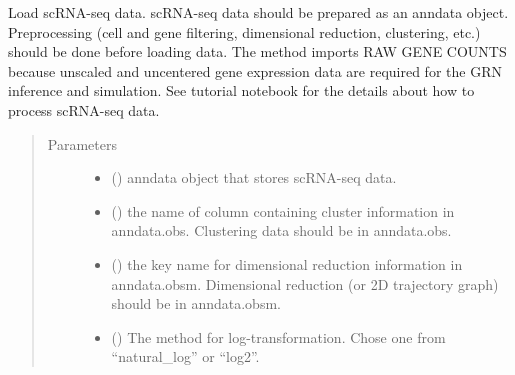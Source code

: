 \documentclass[letterpaper,10pt,english]{sphinxmanual}
\begin{document}
\begin{fulllineitems}
\begin{fulllineitems}
\label{\detokenize{modules/celloracle:celloracle.Oracle.import_anndata_as_raw_count}}
Load scRNA-seq data. scRNA-seq data should be prepared as an anndata object.
Preprocessing (cell and gene filtering, dimensional reduction, clustering, etc.) should be done before loading data.
The method imports RAW GENE COUNTS because unscaled and uncentered gene expression data are required for the GRN inference and simulation.
See tutorial notebook for the details about how to process scRNA-seq data.
\begin{quote}\begin{description}
\item[{Parameters}] \leavevmode\begin{itemize}
\item {} 
 () \textendash{} anndata object that stores scRNA-seq data.

\item {} 
 () \textendash{} the name of column containing cluster information in anndata.obs.
Clustering data should be in anndata.obs.

\item {} 
 () \textendash{} the key name for dimensional reduction information in anndata.obsm.
Dimensional reduction (or 2D trajectory graph) should be in anndata.obsm.

\item {} 
 () \textendash{} The method for log-transformation. Chose one from “natural\_log” or “log2”.

\end{itemize}

\end{description}\end{quote}

\end{fulllineitems}



\end{fulllineitems}
\end{document}
